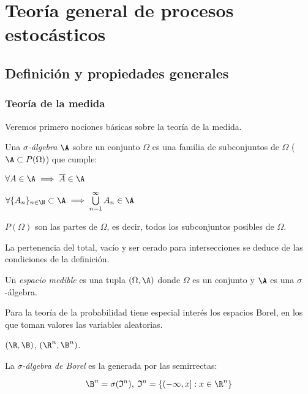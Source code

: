 \section{Teoría general de procesos estocásticos}

\subsection{Definición y propiedades generales}

\subsubsection{Teoría de la medida}

Veremos primero nociones básicas sobre la teoría de la medida.

\begin{ndef}
  Una \emph{$\sigma$-álgebra} $\A$ sobre un conjunto $\Omega$ es una familia de subconjuntos de $\Omega$ ($\A \subset P(\Omega)$) que cumple:

  \begin{nlist}
    \item $\forall A \in \A \implies \overline{A} \in \A$
    \item $\forall \{A_n\}_{n \in \N} \subset \A \implies \bigcup \limits^\infty_{n = 1} A_n \in \A$
  \end{nlist}
\end{ndef}

\begin{nota}
  $P(\Omega)$ son las partes de $\Omega$, es decir, todos los subconjuntos posibles de $\Omega$.
\end{nota}

La pertenencia del total, vacío y ser cerado para intersecciones se deduce de las condiciones de la definición.

\begin{ndef}
  Un \emph{espacio medible} es una tupla $(\Omega, \A)$ donde $\Omega$ es un conjunto y $\A$ es una $\sigma$-álgebra.
\end{ndef}

Para la teoría de la probabilidad tiene especial interés los espacios Borel, en los que toman valores las variables aleatorias.

\begin{ejemplo}
  $(\R, \B)$, $(\R^n, \B^n)$.
\end{ejemplo}

\begin{ndef}
  La \emph{$\sigma$-álgebra de Borel} es la generada por las semirrectas:

  $$\B^n = \sigma(\mathfrak{I}^n), \; \mathfrak{I}^n = \{ (-\infty, x]: x \in \R^n \}$$
\end{ndef}

